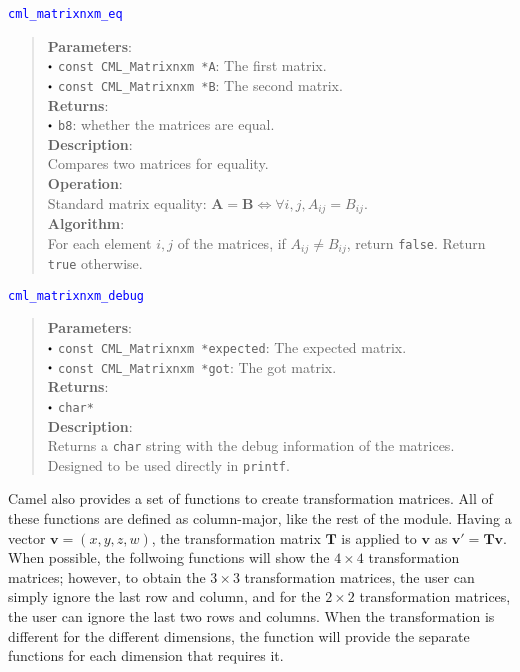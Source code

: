 \documentclass[a4paper,oneside,8pt]{extarticle}
\newcommand{\function}[1]{
  \noindent\textcolor{blue}{\texttt{#1}}
  \vspace{-0.3em}
}
\renewcommand{\dot}{\raisebox{0.3ex}{\scalebox{0.6}{$\bullet$}}}
\theoremstyle{definition}
\begin{document}
\function{cml\_matrixnxm\_eq}
\begin{quote}
  \textbf{Parameters}: \\
  $\dot$ \texttt{const CML\_Matrixnxm *A}: The first matrix. \\
  $\dot$ \texttt{const CML\_Matrixnxm *B}: The second matrix. \\
  \textbf{Returns}: \\
  $\dot$ \texttt{b8}: whether the matrices are equal. \\

  \vspace{-0.75em}
  \textbf{Description}: \\
  Compares two matrices for equality. \\

  \vspace{-0.75em}
  \textbf{Operation}: \\
  Standard matrix equality: $\mathbf{A} = \mathbf{B} \Leftrightarrow \forall i, j, A_{ij} = B_{ij}$. \\

  \vspace{-0.75em}
  \textbf{Algorithm}: \\
  For each element $i, j$ of the matrices, if $A_{ij} \neq B_{ij}$, return \texttt{false}. Return \texttt{true} otherwise. \\
\end{quote}

\function{cml\_matrixnxm\_debug}
\begin{quote}
  \textbf{Parameters}: \\
  $\dot$ \texttt{const CML\_Matrixnxm *expected}: The expected matrix. \\
  $\dot$ \texttt{const CML\_Matrixnxm *got}: The got matrix. \\
  \textbf{Returns}: \\
  $\dot$ \texttt{char*} \\

  \vspace{-0.75em}
  \textbf{Description}: \\
  Returns a \texttt{char} string with the debug information of the matrices. Designed to be used directly in \texttt{printf}. \\
\end{quote}

Camel also provides a set of functions to create transformation matrices. All of these functions are defined as column-major, like the rest of the module. Having a vector $\mathbf{v} = (x, y, z, w)$, the transformation matrix $\mathbf{T}$ is applied to $\mathbf{v}$ as $\mathbf{v}' = \mathbf{T}\mathbf{v}$. When possible, the follwoing functions will show the $4\times 4$ transformation matrices; however, to obtain the $3\times 3$ transformation matrices, the user can simply ignore the last row and column, and for the $2\times 2$ transformation matrices, the user can ignore the last two rows and columns. When the transformation is different for the different dimensions, the function will provide the separate functions for each dimension that requires it.
\end{document}

